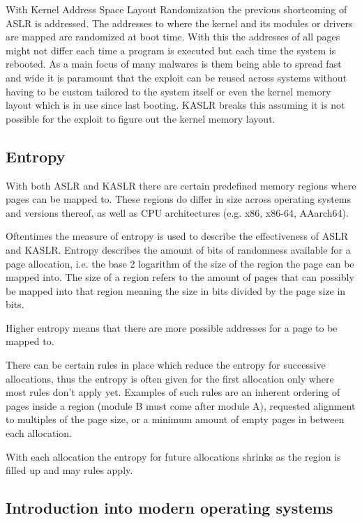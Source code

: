 With Kernel Address Space Layout Randomization the previous shortcoming of ASLR is addressed.
The addresses to where the kernel and its modules or drivers are mapped are randomized at boot time.
With this the addresses of all pages might not differ each time a program is executed but each time the system is rebooted.
As a main focus of many malwares is them being able to spread fast and wide it is paramount that the exploit can be reused across systems without having to be custom tailored to the system itself or even the kernel memory layout which is in use since last booting.
KASLR breaks this assuming it is not possible for the exploit to figure out the kernel memory layout.

\subsection{Entropy}

With both ASLR and KASLR there are certain predefined memory regions where pages can be mapped to.
These regions do differ in size across operating systems and versions thereof, as well as CPU architectures (e.g. x86, x86-64, AAarch64).

Oftentimes the measure of entropy is used to describe the effectiveness of ASLR and KASLR.
Entropy describes the amount of bits of randomness available for a page allocation, i.e. the base 2 logarithm of the size of the region the page can be mapped into.
The size of a region refers to the amount of pages that can possibly be mapped into that region meaning the size in bits divided by the page size in bits.

Higher entropy means that there are more possible addresses for a page to be mapped to.

There can be certain rules in place which reduce the entropy for successive allocations,  thus the entropy is often given for the first allocation only where most rules don't apply yet.
Examples of such rules are an inherent ordering of pages inside a region (module B must come after module A), requested alignment to multiples of the page size, or a minimum amount of empty pages in between each allocation.

With each allocation the entropy for future allocations shrinks as the region is filled up and may rules apply.

\subsection{Introduction into modern operating systems}

